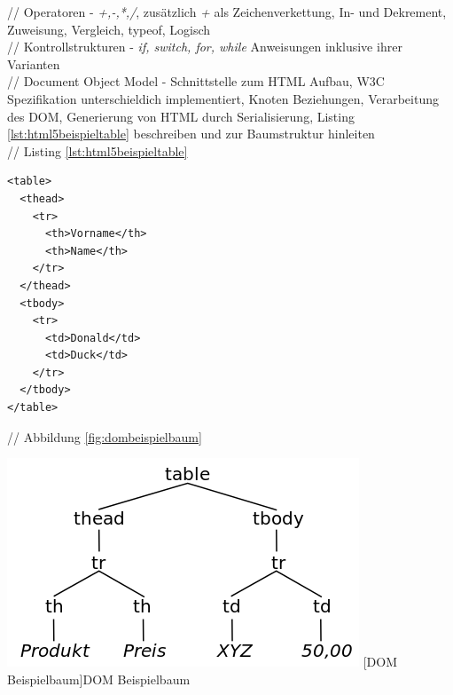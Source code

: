 \documentclass[12pt,a4paper,bibliography=totocnumbered,listof=totocnumbered]{scrartcl}
\begin{document}
// Operatoren - \textit{+,-,*,/}, zusätzlich \textit{+} als Zeichenverkettung, In- und Dekrement, Zuweisung, Vergleich, typeof, Logisch\\

// Kontrollstrukturen - \textit{if, switch, for, while} Anweisungen inklusive ihrer Varianten\\

// Document Object Model - Schnittstelle zum HTML Aufbau, W3C Spezifikation unterschieldich implementiert, Knoten Beziehungen, Verarbeitung des DOM, Generierung von HTML durch Serialisierung, Listing \ref{lst:html5beispieltable} beschreiben und zur Baumstruktur hinleiten\\
// Listing \ref{lst:html5beispieltable}
	\vspace{1em}
	\begin{lstlisting}[caption=DOM5 Beispiel Definition, label=lst:html5beispieltable]
<table>
  <thead>
    <tr>
      <th>Vorname</th>
      <th>Name</th>
    </tr>
  </thead>
  <tbody>
    <tr>
      <td>Donald</td>
      <td>Duck</td>
    </tr>
  </tbody>
</table>
	\end{lstlisting}

// Abbildung \ref{fig:dombeispielbaum}\\
	\vspace{1em}
	\begin{minipage}{\linewidth}
		\centering
		\includegraphics[width=0.5\linewidth]{images/dom_sampletree.png}
		[DOM Beispielbaum]{DOM Beispielbaum}
		\label{fig:dombeispielbaum}
	\end{minipage}
\end{document}
